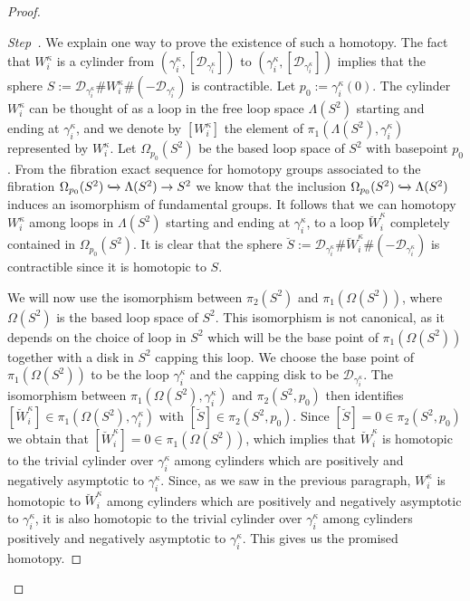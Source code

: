 \documentclass[AHL,Unicode,longabstracts,published]{cedram}
\newcommand{\clD}{\mathcal{D}}
\newcounter{stepcount}
\newenvironment{step}{\refstepcounter{stepcount}\begin{proof}[Step~\thestepcount]}{\let\qed\relax\end{proof}}
\begin{document}
\begin{proof}
\begin{step}
We explain one way to prove the existence of such a homotopy. The fact that ${W}^{\kappa}_i$ is a cylinder from $(\gamma^\kappa_i,[\clD_{\gamma^\kappa_i}])$ to $(\gamma^\kappa_i,[\clD_{\gamma^\kappa_i}])$ implies that the sphere $S := \clD_{\gamma^\kappa_i} \# {W}^{\kappa}_i \# (-\clD_{\gamma^\kappa_i})$ is contractible. Let $p_0:= \gamma_i^\kappa(0)$. The cylinder ${W}^{\kappa}_i$ can be thought of as a loop in the free loop space $\Lambda(S^2)$ starting and ending at $\gamma_i^\kappa$, and we denote by $[{W}^{\kappa}_i]$ the element of $\pi_1(\Lambda(S^2),\gamma_i^\kappa)$ represented by ${W}^{\kappa}_i$. Let $\Omega_{p_0}(S^2)$ be the based loop space of $S^2$ with basepoint $p_0$. From the fibration exact sequence for homotopy groups associated to the fibration $\Omega_{p_0}(S^2) \xhookrightarrow{} \Lambda(S^2) \to S^2 $ we know that the inclusion $\Omega_{p_0}(S^2) \xhookrightarrow{} \Lambda(S^2)$ induces an isomorphism of fundamental groups. It follows that we can homotopy ${W}^{\kappa}_i$ among loops in $\Lambda(S^2)$ starting and ending at $\gamma_i^\kappa$, to a loop $\breve{W}^{\kappa}_i$ completely contained in $\Omega_{p_0}(S^2)$. It is clear that the sphere $\breve{S} := \clD_{\gamma^\kappa_i} \# \breve{W}^{\kappa}_i \# (-\clD_{\gamma^\kappa_i})$ is contractible since it is homotopic to $S$.

We will now use the isomorphism between $\pi_2(S^2)$ and $\pi_1(\Omega(S^2))$, where $\Omega({S^2})$ is the based loop space of ${S^2}$. This isomorphism is not canonical, as it depends on the choice of loop in $S^2$ which will be the base point of $\pi_1(\Omega({S^2}))$ together with a disk in $S^2$ capping this loop. We choose the base point of $\pi_1(\Omega(S^2))$ to be the loop $\gamma^\kappa_i$ and the capping disk to be $\clD_{\gamma^\kappa_i}$. The isomorphism between $\pi_1(\Omega({S^2}),\gamma^\kappa_i)$ and $\pi_2(S^2,p_0)$ then identifies $[\breve{W}^\kappa_i] \in \pi_1(\Omega(S^2),\gamma^\kappa_i)$ with $[\breve{S}] \in \pi_2(S^2,p_0)$. Since $[\breve{S}] = 0 \in \pi_2(S^2,p_0) $ we obtain that $[\breve{W}^{\kappa}_i] =0 \in \pi_1(\Omega(S^2))$, which implies that $\breve{W}^{\kappa}_i$ is homotopic to the trivial cylinder over $\gamma^\kappa_i$ among cylinders which are positively and negatively asymptotic to $\gamma^\kappa_i$. Since, as we saw in the previous paragraph, ${W}^{\kappa}_i$ is homotopic to $\breve{W}^{\kappa}_i$ among cylinders which are positively and negatively asymptotic to $\gamma^\kappa_i$, it is also homotopic to the trivial cylinder over $\gamma^\kappa_i$ among cylinders positively and negatively asymptotic to $\gamma^\kappa_i$. This gives us the promised homotopy.




\end{step}
\end{proof}
\end{document}
